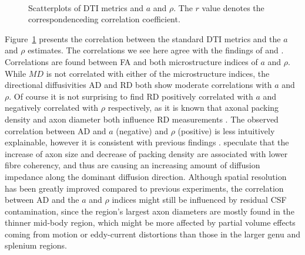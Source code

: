 \begin{figure}[ht]
{\begin{minipage}{0.5\textwidth}
					\begin{adjustbox}{width={\textwidth},totalheight=\textheight,keepaspectratio}
						\strut
						
					\end{adjustbox}\\
					\begin{adjustbox}{width={\textwidth},totalheight=\textheight,keepaspectratio}
						\strut
						
					\end{adjustbox}
					\end{minipage}
				}		
	\caption{Scatterplots of DTI metrics and $a$ and $\rho$. The $r$ value denotes the correspondenceding correlation coefficient.}
	\label{fig:chap 9 DTI correlations}	
\end{figure}	
Figure~\ref{fig:chap 9 DTI correlations} presents the correlation between the standard DTI metrics and the $a$ and $\rho$ estimates. The correlations we see here agree with the findings of \citep{Barazany:2009} and \citep{Alexander:2010}. Correlations are found between FA and both microstructure indices of $a$ and $\rho$. While $MD$ is not correlated with either of the microstructure indices, the directional diffusivities AD and RD both show moderate correlations with $a$ and $\rho$. Of course it is not surprising to find RD positively correlated with $a$ and negatively correlated with $\rho$ respectively, as it is known that axonal packing density and axon diameter both influence RD measurements \citep{Beaulieu:2002}. The observed correlation between AD and $a$ (negative) and $\rho$ (positive) is less intuitively explainable, however it is consistent with previous findings \citep{Barazany:2009,Alexander:2010}.  speculate that the increase of axon size and decrease of packing density are associated with lower fibre coherency, and thus are causing an increasing amount of diffusion impedance along the dominant diffusion direction. Although spatial resolution has been greatly improved compared to previous experiments, the correlation between AD and the $a$ and $\rho$ indices might still be influenced by residual CSF contamination, since the region's largest axon diameters are mostly found in the thinner mid-body region, which might be more affected by partial volume effects coming from motion or eddy-current distortions than those in the larger genu and splenium regions. 
\egroup %
\FloatBarrier
